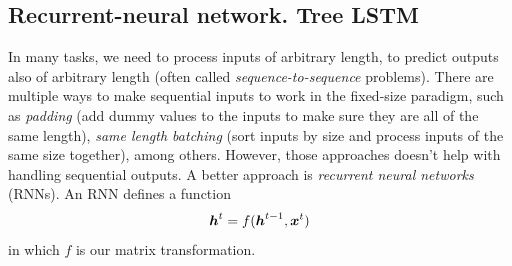 \subsection{Recurrent-neural network. Tree LSTM}
In many tasks, we need to process inputs of arbitrary length, to predict outputs also of arbitrary length (often called \emph{sequence-to-sequence} problems). There are multiple ways to make sequential inputs to work in the fixed-size paradigm, such as \emph{padding} (add dummy values to the inputs to make sure they are all of the same length), \emph{same length batching} (sort inputs by size and process inputs of the same size together), among others. However, those approaches doesn't help with handling sequential outputs. A better approach is \emph{recurrent neural networks} (RNNs). An RNN defines a function
\begin{align}
\boldsymbol{h}^t = f(\boldsymbol{h}^{t-1}, \boldsymbol{x}^{t})
\end{align}
in which $f$ is our matrix transformation. 

